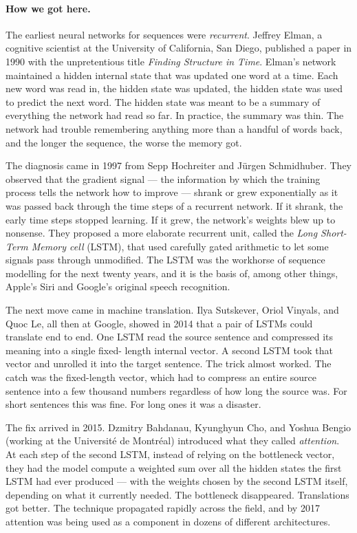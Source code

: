 \paragraph{How we got here.} The earliest neural networks for sequences were \emph{recurrent}.
Jeffrey Elman, a cognitive scientist at the University of
California, San Diego, published a paper in 1990 with the
unpretentious title \emph{Finding Structure in Time}. Elman's
network maintained a hidden internal state that was updated one
word at a time. Each new word was read in, the hidden state was
updated, the hidden state was used to predict the next word.
The hidden state was meant to be a summary of everything the
network had read so far. In practice, the summary was thin. The
network had trouble remembering anything more than a handful of
words back, and the longer the sequence, the worse the memory
got.

The diagnosis came in 1997 from Sepp Hochreiter and J\"urgen
Schmidhuber. They observed that the gradient signal --- the
information by which the training process tells the network how
to improve --- shrank or grew exponentially as it was passed back
through the time steps of a recurrent network. If it shrank, the
early time steps stopped learning. If it grew, the network's
weights blew up to nonsense. They proposed a more elaborate
recurrent unit, called the \emph{Long Short-Term Memory cell}
(LSTM), that used carefully gated arithmetic to let some signals
pass through unmodified. The LSTM was the workhorse of
sequence modelling for the next twenty years, and it is the
basis of, among other things, Apple's Siri and Google's
original speech recognition.

The next move came in machine translation. Ilya Sutskever, Oriol
Vinyals, and Quoc Le, all then at Google, showed in 2014 that a
pair of LSTMs could translate end to end. One LSTM read the
source sentence and compressed its meaning into a single fixed-
length internal vector. A second LSTM took that vector and
unrolled it into the target sentence. The trick almost worked.
The catch was the fixed-length vector, which had to compress an
entire source sentence into a few thousand numbers regardless of
how long the source was. For short sentences this was fine. For
long ones it was a disaster.

The fix arrived in 2015. Dzmitry Bahdanau, Kyunghyun Cho, and
Yoshua Bengio (working at the Universit\'e de Montr\'eal)
introduced what they called \emph{attention}. At each step of
the second LSTM, instead of relying on the bottleneck vector,
they had the model compute a weighted sum over all the hidden
states the first LSTM had ever produced --- with the weights
chosen by the second LSTM itself, depending on what it currently
needed. The bottleneck disappeared. Translations got better.
The technique propagated rapidly across the field, and by 2017
attention was being used as a component in dozens of different
architectures.

